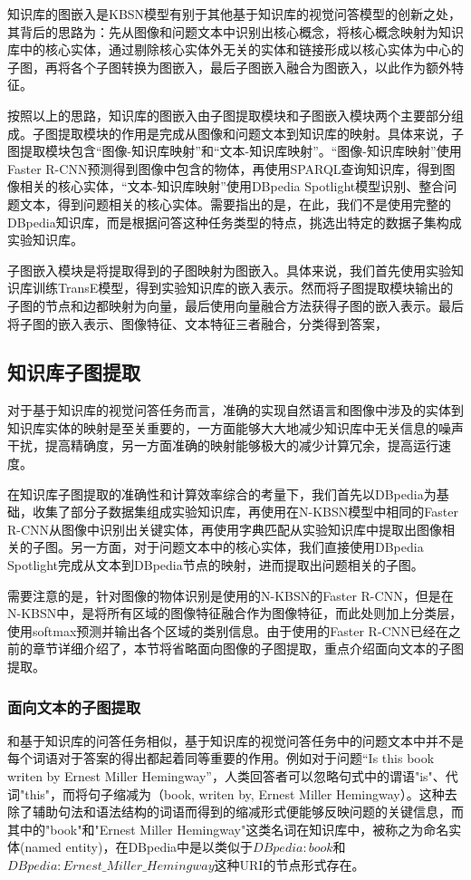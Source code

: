 知识库的图嵌入是KBSN模型有别于其他基于知识库的视觉问答模型的创新之处，其背后的思路为：先从图像和问题文本中识别出核心概念，将核心概念映射为知识库中的核心实体，通过剔除核心实体外无关的实体和链接形成以核心实体为中心的子图，再将各个子图转换为图嵌入，最后子图嵌入融合为图嵌入，以此作为额外特征。

按照以上的思路，知识库的图嵌入由子图提取模块和子图嵌入模块两个主要部分组成。子图提取模块的作用是完成从图像和问题文本到知识库的映射。具体来说，子图提取模块包含“图像-知识库映射”和“文本-知识库映射”。“图像-知识库映射”使用Faster R-CNN预测得到图像中包含的物体，再使用SPARQL查询知识库，得到图像相关的核心实体，“文本-知识库映射”使用DBpedia Spotlight模型识别、整合问题文本，得到问题相关的核心实体。需要指出的是，在此，我们不是使用完整的DBpedia知识库，而是根据问答这种任务类型的特点，挑选出特定的数据子集构成实验知识库。

子图嵌入模块是将提取得到的子图映射为图嵌入。具体来说，我们首先使用实验知识库训练TransE模型，得到实验知识库的嵌入表示。然而将子图提取模块输出的子图的节点和边都映射为向量，最后使用向量融合方法获得子图的嵌入表示。最后将子图的嵌入表示、图像特征、文本特征三者融合，分类得到答案，

\subsection{知识库子图提取}
对于基于知识库的视觉问答任务而言，准确的实现自然语言和图像中涉及的实体到知识库实体的映射是至关重要的，一方面能够大大地减少知识库中无关信息的噪声干扰，提高精确度，另一方面准确的映射能够极大的减少计算冗余，提高运行速度。

在知识库子图提取的准确性和计算效率综合的考量下，我们首先以DBpedia为基础，收集了部分子数据集组成实验知识库，再使用在N-KBSN模型中相同的Faster R-CNN从图像中识别出关键实体，再使用字典匹配从实验知识库中提取出图像相关的子图。另一方面，对于问题文本中的核心实体，我们直接使用DBpedia Spotlight完成从文本到DBpedia节点的映射，进而提取出问题相关的子图。

需要注意的是，针对图像的物体识别是使用的N-KBSN的Faster R-CNN，但是在N-KBSN中，是将所有区域的图像特征融合作为图像特征，而此处则加上分类层，使用softmax预测并输出各个区域的类别信息。由于使用的Faster R-CNN已经在之前的章节详细介绍了，本节将省略面向图像的子图提取，重点介绍面向文本的子图提取。

\subsubsection{面向文本的子图提取}
和基于知识库的问答任务相似，基于知识库的视觉问答任务中的问题文本中并不是每个词语对于答案的得出都起着同等重要的作用。例如对于问题“Is this book writen by Ernest Miller Hemingway”，人类回答者可以忽略句式中的谓语"is"、代词"this"，而将句子缩减为（book, writen by, Ernest Miller Hemingway）。这种去除了辅助句法和语法结构的词语而得到的缩减形式便能够反映问题的关键信息，而其中的"book"和"Ernest Miller Hemingway"这类名词在知识库中，被称之为命名实体(named entity)，在DBpedia中是以类似于$DBpedia:book$和$DBpedia:Ernest\_Miller\_Hemingway$这种URI的节点形式存在。

